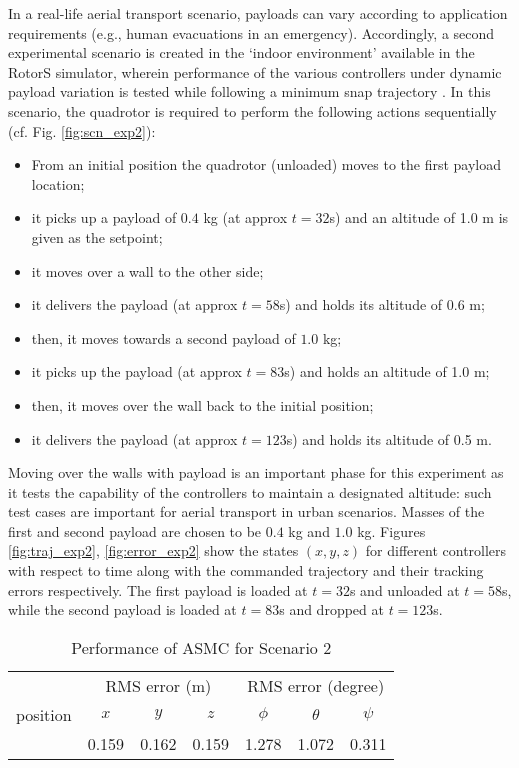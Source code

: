 In a real-life aerial transport scenario, payloads can vary according to application requirements (e.g., human evacuations in an emergency). Accordingly, a second experimental scenario is created in the `indoor environment' available in the RotorS simulator, wherein performance of the various controllers under dynamic payload variation is tested while following a minimum snap trajectory \cite{mellinger2011minimum}. In this scenario, the quadrotor is required to perform the following actions sequentially (cf. Fig. \ref{fig:scn_exp2}):
\begin{itemize}
    \item From an initial position the quadrotor (unloaded) moves to the first payload location;
    \item it picks up a payload of $0.4$ kg (at approx $t=32$s) and an altitude of 1.0 m is given as the setpoint;
    \item it moves over a wall to the other side;
    \item it delivers the payload (at approx $t=58$s) and holds its altitude of 0.6 m;
    \item then, it moves towards a second payload of $1.0$ kg;
    \item it picks up the payload (at approx $t=83$s) and holds an altitude of 1.0 m;
    \item then, it moves over the wall back to the initial position;
    \item it delivers the payload (at approx $t=123$s) and holds its altitude of 0.5 m.
\end{itemize}
Moving over the walls with payload is an important phase for this experiment as it tests the capability of the controllers to maintain a designated altitude: such test cases are important for aerial transport in urban scenarios.
Masses of the first and second payload are chosen to be $0.4$ kg and $1.0$ kg. Figures \ref{fig:traj_exp2}, \ref{fig:error_exp2} show the states $(x, y, z)$ for different controllers with respect to time along with the commanded trajectory and their tracking errors respectively. The first payload is loaded at $t=32$s and unloaded at $t=58$s, while the second payload is loaded at $t=83$s and dropped at $t=123$s.

\begin{table}[!h]
\renewcommand{\arraystretch}{1.1}
\caption{{Performance of ASMC for Scenario 2}}
\label{table 2}
		\centering
{
{	\begin{tabular}{c c c c c c c}
		\hline
		\hline
		& \multicolumn{3}{c}{RMS error (m)} & \multicolumn{3}{c}{RMS error (degree)}  \\ \cline{1-7}
		 position & $x$ & $y$  & $z$  & $\phi$ & $\theta$  & $\psi$  \\
		\hline
	& {0.159} & {0.162}  & {0.159} & 1.278 & 1.072  & 0.311 \\
		\hline
		\hline
\end{tabular}}}
\end{table}

